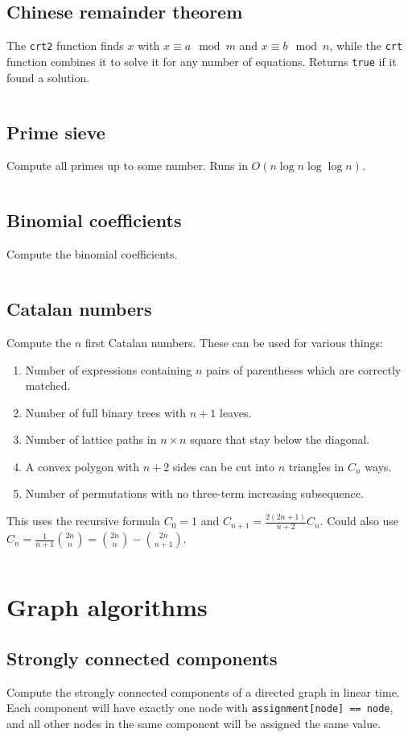 \documentclass[10pt,a4paper,landscape,oneside]{amsart}
\newcommand{\code}[1]{\inputminted[fontsize=\large,tabsize=2,baselinestretch=1]{java}{#1}}
\begin{document}
\begin{multicols*}{2}
\subsection{Chinese remainder theorem}
The \texttt{crt2} function finds \(x\) with \(x \equiv a \mod m\) and \(x \equiv b \mod
n\), while the \texttt{crt} function combines it to solve it for any number of equations.
Returns \texttt{true} if it found a solution.
\code{number-theory/crt.java}
\subsection{Prime sieve}
Compute all primes up to some number. Runs in \(O(n \log n \log \log n)\).
\code{number-theory/sieve.java}
\subsection{Binomial coefficients}
Compute the binomial coefficients.
\code{number-theory/binom.java}
\subsection{Catalan numbers}
Compute the \(n\) first Catalan numbers. These can be used for various things:
\begin{enumerate}
  \item Number of expressions containing \(n\) pairs of parentheses which are correctly
    matched.
  \item Number of full binary trees with \(n+1\) leaves.
  \item Number of lattice paths in \(n \times n\) square that stay below the diagonal.
  \item A convex polygon with \(n+2\) sides can be cut into \(n\) triangles in \(C_n\)
    ways.
  \item Number of permutations with no three-term increasing subsequence.
\end{enumerate}
This uses the recursive formula \(C_0 = 1\) and \(C_{n+1} = \frac{2(2n+1)}{n+2} C_n\).
Could also use \(C_n = \frac{1}{n+1}\binom{2n}{n} = \binom{2n}{n} - \binom{2n}{n+1}\).
\code{number-theory/catalan.java}

\section{Graph algorithms}
\subsection{Strongly connected components}
Compute the strongly connected components of a directed graph in linear time. Each
component will have exactly one node with \verb|assignment[node] == node|, and all other
nodes in the same component will be assigned the same value.
\code{graph/strongly-connected.java}

\end{multicols*}
\end{document}
